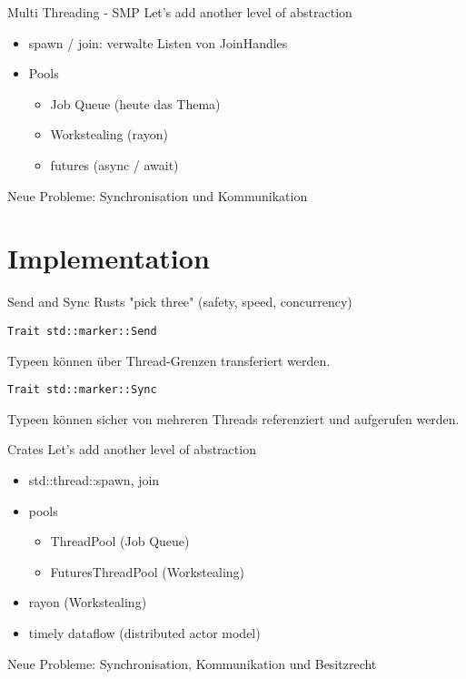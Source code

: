 \documentclass[aspectratio=1610,t]{beamer}
\begin{document}
\begin{frame}[fragile]{Multi Threading - SMP}
Let's add another level of abstraction
\begin{itemize}
  \item spawn / join: verwalte Listen von JoinHandles
  \item Pools \begin{itemize}
      \item Job Queue (heute das Thema)
      \item Workstealing (rayon)
      \item futures (async / await)
    \end{itemize}
\end{itemize}

Neue Probleme: Synchronisation und Kommunikation

\end{frame}

{
\section{Implementation}
}

\begin{frame}[fragile]{Send and Sync}
Rusts "pick three" (safety, speed, concurrency)

\begin{verbatim}
Trait std::marker::Send
\end{verbatim}
Typeen können über Thread-Grenzen transferiert werden.

\begin{verbatim}
Trait std::marker::Sync
\end{verbatim}
Typeen können sicher von mehreren Threads referenziert und aufgerufen werden.

\end{frame}

\begin{frame}[fragile]{Crates}
Let's add another level of abstraction
\begin{itemize}
  \item std::thread::{spawn, join}
  \item pools \begin{itemize}
      \item ThreadPool (Job Queue)
      \item FuturesThreadPool (Workstealing)
    \end{itemize}
  \item rayon (Workstealing)
  \item timely dataflow (distributed actor model)
\end{itemize}

Neue Probleme: Synchronisation, Kommunikation und Besitzrecht

\end{frame}
\end{document}
